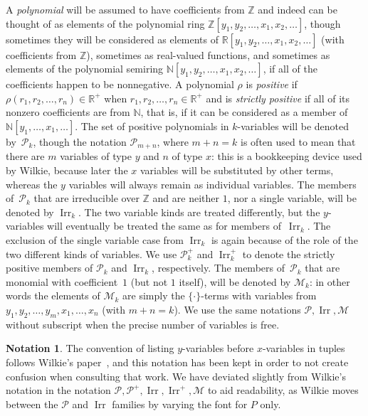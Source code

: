 \documentclass[eqnor,reqno]{amsart}
\theoremstyle{plain}
\theoremstyle{definition}
\newtheorem{notation}[thm]{Notation}
\newcommand{\Irr}{\operatorname{Irr}}
\begin{document}
A \emph{polynomial} will be assumed to have coefficients from $\mathbb{Z}$ and indeed can be thought of as elements of the polynomial ring $\mathbb{Z}[y_1,y_2,\dots,x_1,x_2,\dots]$, though sometimes they will be considered as elements of $\mathbb{R}[y_1,y_2,\dots,x_1,x_2,\dots]$ (with coefficients from $\mathbb{Z}$), sometimes as real-valued functions, and sometimes as elements of the polynomial semiring $\mathbb{N}[y_1,y_2,\dots,x_1,x_2,\dots]$, if all of the coefficients happen to be nonnegative.  
A  polynomial $\rho$ is \emph{positive} if $\rho(r_1, r_2, \dots , r_n)\in \mathbb{R}^+$ when $r_1, r_2, \dots , r_n\in  \mathbb{R^+}$ and is \emph{strictly positive} if all of its nonzero coefficients are from $\mathbb{N}$, that is, if it can be considered as a member of $\mathbb{N}[y_1,\dots,x_1,\dots]$.  
The set of positive polynomials in $k$-variables will be denoted by~$\mathcal{P}_k$, though the notation $\mathcal{P}_{m+n}$, where $m+n=k$ is often used to mean that there are $m$ variables of type $y$ and $n$ of type $x$: this is a bookkeeping device used by Wilkie, because later the $x$ variables will be substituted by other terms, whereas the $y$ variables will always remain as individual variables.
The members of~$\mathcal{P}_k$ that are irreducible over $\mathbb{Z}$ and are neither $1$, nor a single variable, will be denoted by $\Irr_k$.  
The two variable kinds are treated differently, but the $y$-variables will eventually be treated the same as for members of~$\Irr_{k}$.  
The exclusion of the single variable case from $\Irr_{k}$ is again because of the role of the two different kinds of variables.
We use $\mathcal{P}_k^+$ and $\Irr_k^+$ to denote  the strictly positive members of $\mathcal{P}_k$ and $\Irr_k$, respectively.  
The members of~$\mathcal{P}_k$ that are monomial with coefficient~$1$ (but not $1$ itself), will be denoted by $\mathcal{M}_k$: in other words the elements of $\mathcal{M}_k$ are simply the $\{\cdot\}$-terms with variables from $y_1,y_2,\dots, y_m,x_1,\dots,x_n$ (with $m+n=k$).
We use the same notations $\mathcal{P},\Irr,\mathcal{M}$ without subscript when the precise number of variables is free.

\begin{notation} The convention of listing $y$-variables before  $x$-variables in tuples follows Wilkie's paper~\cite{wil00}, and this notation has been kept in order to not create confusion when consulting that work.   
We have deviated slightly from Wilkie's notation in the notation $\mathcal{P},\mathcal{P}^+, \Irr,\Irr^+,\mathcal{M}$ to aid readability, as Wilkie moves between the $\mathcal{P}$ and $\Irr$ families by varying the font for $P$ only.
\end{notation}
\end{document}
